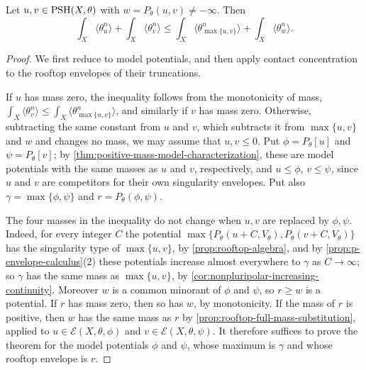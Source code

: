 \begin{theorem}\label{thm:rooftop-mass-diamond}
Let $u,v\in\mathrm{PSH}(X,\theta)$ with $w=P_\theta(u,v)\ne-\infty$. Then
\[
 \int_X\langle\theta_u^n\rangle+\int_X\langle\theta_v^n\rangle\leq\int_X\langle\theta_{\max\{u,v\}}^n\rangle+\int_X\langle\theta_w^n\rangle.
\]
\end{theorem}
\begin{proof}
We first reduce to model potentials, and then apply contact concentration to the rooftop envelopes of their truncations.

If $u$ has mass zero, the inequality follows from the monotonicity of mass, $\int_X\langle\theta_v^n\rangle\leq\int_X\langle\theta_{\max\{u,v\}}^n\rangle$, and similarly if $v$ has mass zero. Otherwise, subtracting the same constant from $u$ and $v$, which subtracts it from $\max\{u,v\}$ and $w$ and changes no mass, we may assume that $u,v\leq0$. Put $\phi=P_\theta[u]$ and $\psi=P_\theta[v]$; by \cref{thm:positive-mass-model-characterization}, these are model potentials with the same masses as $u$ and $v$, respectively, and $u\leq\phi$, $v\leq\psi$, since $u$ and $v$ are competitors for their own singularity envelopes. Put also $\gamma=\max\{\phi,\psi\}$ and $r=P_\theta(\phi,\psi)$.

The four masses in the inequality do not change when $u,v$ are replaced by $\phi,\psi$. Indeed, for every integer $C$ the potential $\max\{P_\theta(u+C,V_\theta),P_\theta(v+C,V_\theta)\}$ has the singularity type of $\max\{u,v\}$, by \cref{prop:rooftop-algebra}, and by \cref{prop:p-envelope-calculus}(2) these potentials increase almost everywhere to $\gamma$ as $C\to\infty$; so $\gamma$ has the same mass as $\max\{u,v\}$, by \cref{cor:nonpluripolar-increasing-continuity}. Moreover $w$ is a common minorant of $\phi$ and $\psi$, so $r\geq w$ is a potential. If $r$ has mass zero, then so has $w$, by monotonicity. If the mass of $r$ is positive, then $w$ has the same mass as $r$ by \cref{prop:rooftop-full-mass-substitution}, applied to $u\in\mathcal E(X,\theta,\phi)$ and $v\in\mathcal E(X,\theta,\psi)$. It therefore suffices to prove the theorem for the model potentials $\phi$ and $\psi$, whose maximum is $\gamma$ and whose rooftop envelope is $r$.


\end{proof}
